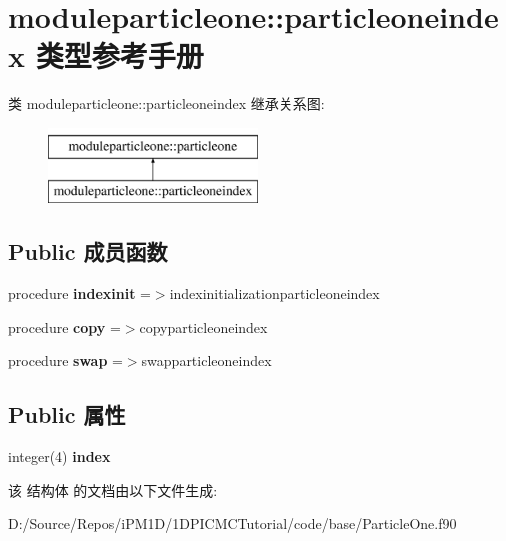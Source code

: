 \hypertarget{structmoduleparticleone_1_1particleoneindex}{}\section{moduleparticleone\+::particleoneindex 类型参考手册}
\label{structmoduleparticleone_1_1particleoneindex}
类 moduleparticleone\+::particleoneindex 继承关系图\+:\begin{figure}[H]
\begin{center}
\leavevmode
\includegraphics[height=2.000000cm]{structmoduleparticleone_1_1particleoneindex}
\end{center}
\end{figure}
\subsection*{Public 成员函数}
\begin{DoxyCompactItemize}
\item 
\mbox{\label{structmoduleparticleone_1_1particleoneindex_a76e99d2b764e1460d3160c24565d43f2}} 
procedure {\bfseries indexinit} =$>$indexinitializationparticleoneindex
\item 
\mbox{\label{structmoduleparticleone_1_1particleoneindex_a7a2167979f3d52926c403871d739b1b6}} 
procedure {\bfseries copy} =$>$copyparticleoneindex
\item 
\mbox{\label{structmoduleparticleone_1_1particleoneindex_a34f174863479942ebcf59fea25fcad59}} 
procedure {\bfseries swap} =$>$swapparticleoneindex
\end{DoxyCompactItemize}
\subsection*{Public 属性}
\begin{DoxyCompactItemize}
\item 
\mbox{\label{structmoduleparticleone_1_1particleoneindex_abd837c95ebabd745fb95b1b5563ca666}} 
integer(4) {\bfseries index}
\end{DoxyCompactItemize}


该 结构体 的文档由以下文件生成\+:\begin{DoxyCompactItemize}
\item 
D\+:/\+Source/\+Repos/i\+P\+M1\+D/1\+D\+P\+I\+C\+M\+C\+Tutorial/code/base/Particle\+One.\+f90\end{DoxyCompactItemize}
